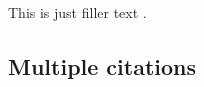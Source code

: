 \documentclass[a4paper]{article}
\begin{document}

This is just filler text \autocite{companion}.

\subsection*{Multiple citations}


\cite{companion,augustine,bertram,cotton,hammond,massa,murray}

\clearpage


\nocite{*}
\printbibliography
\end{document}
